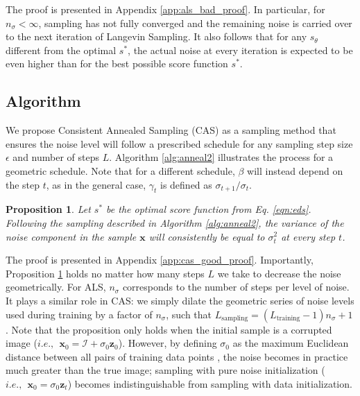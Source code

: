 \documentclass{article} \usepackage{iclr2021_conference_notitle,times}
\theoremstyle{definition}
\theoremstyle{definition}
\newtheorem{proposition}{Proposition}
\begin{document}
The proof is presented in Appendix \ref{app:als_bad_proof}.
In particular, for $n_\sigma < \infty$, sampling has not fully converged and the remaining noise is carried over to the next iteration of Langevin Sampling. It also follows that for any $s_\theta$ different from the optimal $s^*$, the actual noise at every iteration is expected to be even higher than for the best possible score function $s^*$. 

\subsection{Algorithm}

We propose Consistent Annealed Sampling (CAS) as a sampling method that ensures the noise level will follow a prescribed schedule for any sampling step size $\epsilon$ and number of steps $L$. Algorithm \ref{alg:anneal2} illustrates the process for a geometric schedule. Note that for a different schedule, $\beta$ will instead depend on the step $t$, as in the general case, $\gamma_t$ is defined as $\sigma_{t+1} / \sigma_{t}$.

\begin{proposition}\label{proof:2}
\em Let $s^*$ be the optimal score function from Eq. \ref{eqn:eds}. Following the sampling described in Algorithm \ref{alg:anneal2}, the variance of the noise component in the sample $\boldsymbol{x}$ will consistently be equal to $\sigma_t^2$ at every step $t$. \em 
\end{proposition}




The proof is presented in Appendix \ref{app:cas_good_proof}. Importantly, Proposition \ref{proof:2} holds no matter how many steps $L$ we take to decrease the noise geometrically. For ALS, $n_{\sigma}$ corresponds to the number of steps per level of noise. It plays a similar role in CAS: we simply dilate the geometric series of noise levels used during training by a factor of $n_\sigma$, such that $L_\text{sampling} = (L_\text{training} - 1) n_\sigma + 1$. 
Note that the proposition only holds when the initial sample is a corrupted image ($i.e., ~~ \boldsymbol{x}_0 = \mathcal{I} + \sigma_0 \boldsymbol{z}_0$). However, by defining $\sigma_0$ as the maximum Euclidean distance between all pairs of training data points \citep{song2020improved},
the noise becomes in practice much greater than the true image; sampling with pure noise initialization ($i.e., ~~ \boldsymbol{x}_0 = \sigma_0\boldsymbol{z}_t$) becomes indistinguishable from sampling with data initialization.
\end{document}
